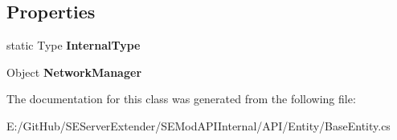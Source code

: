 \subsection*{Properties}
\begin{DoxyCompactItemize}
\item 
\hypertarget{class_s_e_mod_a_p_i_internal_1_1_a_p_i_1_1_entity_1_1_base_entity_network_manager_a39fc2448281541e23df133205232ce2f}{}static Type {\bfseries Internal\+Type}\label{class_s_e_mod_a_p_i_internal_1_1_a_p_i_1_1_entity_1_1_base_entity_network_manager_a39fc2448281541e23df133205232ce2f}

\item 
\hypertarget{class_s_e_mod_a_p_i_internal_1_1_a_p_i_1_1_entity_1_1_base_entity_network_manager_a5ee8907c9337a3700aabbf3812e64c8e}{}Object {\bfseries Network\+Manager}\label{class_s_e_mod_a_p_i_internal_1_1_a_p_i_1_1_entity_1_1_base_entity_network_manager_a5ee8907c9337a3700aabbf3812e64c8e}

\end{DoxyCompactItemize}


The documentation for this class was generated from the following file\+:\begin{DoxyCompactItemize}
\item 
E\+:/\+Git\+Hub/\+S\+E\+Server\+Extender/\+S\+E\+Mod\+A\+P\+I\+Internal/\+A\+P\+I/\+Entity/Base\+Entity.\+cs\end{DoxyCompactItemize}
